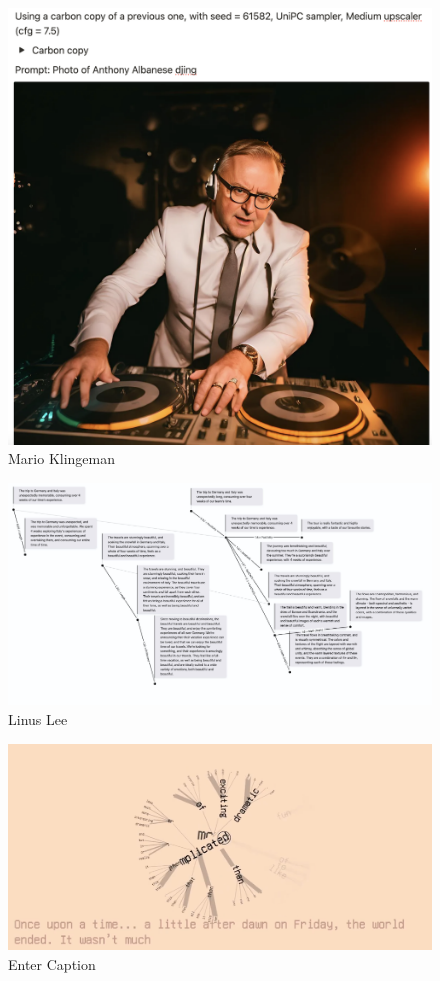 \begin{figure}
    \centering
    \includegraphics[width=1\linewidth]{image.png}
    \caption{Mario Klingeman}
    \label{fig:enter-label}
\end{figure}

\begin{figure}
    \centering
    \includegraphics[width=1\linewidth]{linus.png}
    \caption{Linus Lee}
    \label{fig:enter-label}
\end{figure}

\begin{figure}
    \centering
    \includegraphics[width=1\linewidth]{treewords.png}
    \caption{Enter Caption}
    \label{fig:enter-label}
\end{figure}

